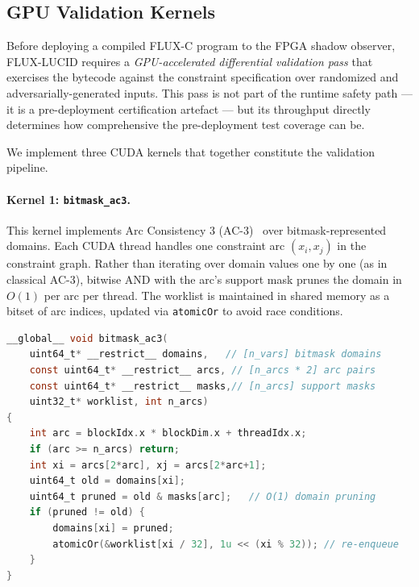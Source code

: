 \documentclass[conference]{IEEEtran}
\begin{document}
\subsection{GPU Validation Kernels}
\label{sec:gpu-kernels}

Before deploying a compiled FLUX-C program to the FPGA shadow observer,
FLUX-LUCID requires a \emph{GPU-accelerated differential validation pass}
that exercises the bytecode against the constraint specification over
randomized and adversarially-generated inputs.
This pass is not part of the runtime safety path — it is a pre-deployment
certification artefact — but its throughput directly determines how
comprehensive the pre-deployment test coverage can be.

We implement three CUDA kernels that together constitute the validation
pipeline.

\paragraph{Kernel 1: \texttt{bitmask\_ac3}.}
This kernel implements Arc Consistency 3 (AC-3)~\cite{mackworth1977} over
bitmask-represented domains.
Each CUDA thread handles one constraint arc $(x_i, x_j)$ in the constraint
graph.
Rather than iterating over domain values one by one (as in classical AC-3),
bitwise AND with the arc's support mask prunes the domain in $O(1)$ per arc
per thread.
The worklist is maintained in shared memory as a bitset of arc indices,
updated via \texttt{atomicOr} to avoid race conditions.

\begin{lstlisting}[language=C, basicstyle=\ttfamily\scriptsize, frame=single]
__global__ void bitmask_ac3(
    uint64_t* __restrict__ domains,   // [n_vars] bitmask domains
    const uint64_t* __restrict__ arcs, // [n_arcs * 2] arc pairs
    const uint64_t* __restrict__ masks,// [n_arcs] support masks
    uint32_t* worklist, int n_arcs)
{
    int arc = blockIdx.x * blockDim.x + threadIdx.x;
    if (arc >= n_arcs) return;
    int xi = arcs[2*arc], xj = arcs[2*arc+1];
    uint64_t old = domains[xi];
    uint64_t pruned = old & masks[arc];   // O(1) domain pruning
    if (pruned != old) {
        domains[xi] = pruned;
        atomicOr(&worklist[xi / 32], 1u << (xi % 32)); // re-enqueue
    }
}
\end{lstlisting}
\end{document}
